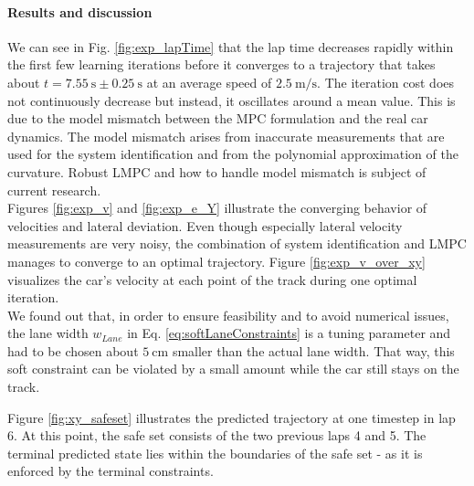 \paragraph{Results and discussion}
We can see in Fig. \ref{fig:exp_lapTime} that the lap time decreases rapidly within the first few learning iterations before it converges to a trajectory that takes about $t=\SI{7.55}{\second} \pm \SI{0.25}{\second}$ at an average speed of $\SI{2.5}{\meter\per\second}$. The iteration cost does not continuously decrease but instead, it oscillates around a mean value. This is due to the model mismatch between the MPC formulation and the real car dynamics. The model mismatch arises from inaccurate measurements that are used for the system identification and from the polynomial approximation of the curvature. Robust LMPC and how to handle model mismatch is subject of current research.\\
Figures \ref{fig:exp_v} and \ref{fig:exp_e_Y} illustrate the converging behavior of velocities and lateral deviation. Even though especially lateral velocity measurements are very noisy, the combination of system identification and LMPC manages to converge to an optimal trajectory.
Figure \ref{fig:exp_v_over_xy} visualizes the car's velocity at each point of the track during one optimal iteration.%
\\
We found out that, in order to ensure feasibility and to avoid numerical issues, the lane width $w_{Lane}$ in Eq. \eqref{eq:softLaneConstraints} is a tuning parameter and had to be chosen about $\SI{5}{\centi\meter}$ smaller than the actual lane width. That way, this soft constraint can be violated by a small amount while the car still stays on the track.

Figure \ref{fig:xy_safeset} illustrates the predicted trajectory at one timestep in lap 6. At this point, the safe set consists of the two previous laps 4 and 5. The terminal predicted state lies within the boundaries of the safe set - as it is enforced by the terminal constraints.

